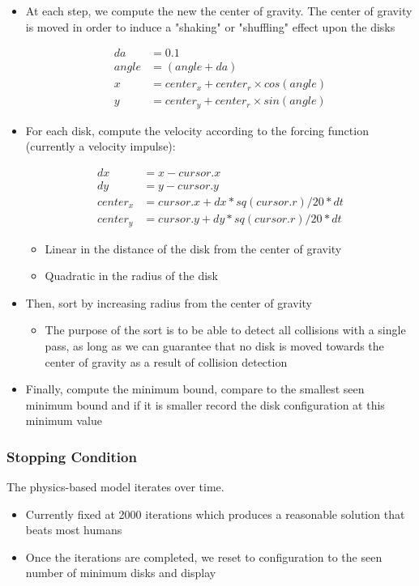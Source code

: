 \documentclass[a4paper]{article}
\begin{document}
\begin{itemize}
\itemsep0em
\item{At each step, we compute the new the center of gravity.  The center of gravity is moved in order to induce a "shaking" or "shuffling" effect upon the disks}


\begin{align}
     da & = 0.1 \\
      angle & = (angle + da) \\ %
      x & = center_x + center_r\times cos(angle) \\
      y & = center_y + center_r\times sin(angle)
\end{align}

\item{For each disk, compute the velocity according to the forcing function (currently a velocity impulse):}

\begin{align}
      dx &= x - cursor.x \\
      dy &= y - cursor.y \\
      center_x &= cursor.x + dx*sq(cursor.r)/20*dt \\
      center_y &= cursor.y + dy*sq(cursor.r)/20*dt
\end{align}
	\begin{itemize}
	\itemsep0em
  \item{Linear in the distance of the disk from the center of gravity}
  \item{Quadratic in the radius of the disk}
  \end{itemize}
\item{Then, sort by increasing radius from the center of gravity}
\begin{itemize}
\itemsep0em
 \item{The purpose of the sort is to be able to detect all collisions with a single pass, as long as we can guarantee that no disk is moved towards the center of gravity as a result of collision detection}
 \end{itemize}
 \item{Finally, compute the minimum bound, compare to the smallest seen minimum bound and if it is smaller record the disk configuration at this minimum value}
 \end{itemize}
  
\subsubsection*{Stopping Condition}
The physics-based model iterates over time.  
\begin{itemize}
\itemsep0em
\item{Currently fixed at 2000 iterations which produces a reasonable solution that beats most humans}
\item{Once the iterations are completed, we reset to configuration to the seen number of minimum disks and display}
\end{itemize}
\end{document}
